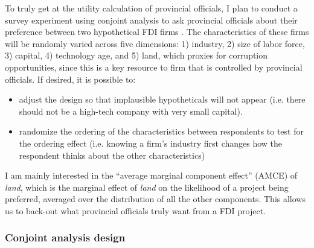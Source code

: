 To truly get at the utility calculation of provincial officials, I plan to conduct a survey experiment using conjoint analysis to ask provincial officials about their preference between two hypothetical FDI firms \citep{Hainmueller2014}. The characteristics of these firms will be randomly varied across five dimensions: 1) industry, 2) size of labor force, 3) capital, 4) technology age, and 5) land, which proxies for corruption opportunities, since this is a key resource to firm that is controlled by provincial officials. If desired, it is possible to:
\begin{itemize}
\item adjust the design so that implausible hypotheticals will not appear (i.e. there should not be a high-tech company with very small capital).
\item randomize the ordering of the characteristics between respondents to test for the ordering effect (i.e. knowing a firm's industry first changes how the respondent thinks about the other characteristics)
\end{itemize}

I am mainly interested in the ``average marginal component effect'' (AMCE) of \textit{land}, which is the marginal effect of \textit{land} on the likelihood of a project being preferred, averaged over the distribution of all the other components. This allows us to back-out what provincial officials truly want from a FDI project.

\subsubsection{Conjoint analysis design}

